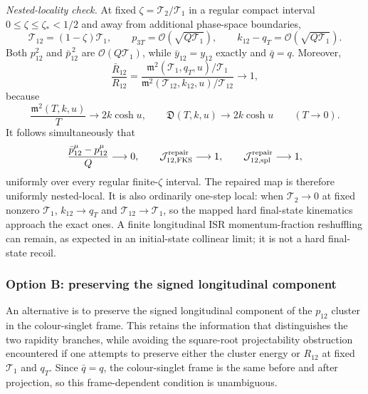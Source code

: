 \documentclass[11pt]{article}
\begin{document}
\medskip
\noindent
\textit{Nested-locality check.}
At fixed $\zeta=\mathcal T_2/\mathcal T_1$ in a regular compact interval
$0\le\zeta\le\zeta_*<1/2$ and away from additional phase-space boundaries,
\begin{equation}
\mathcal T_{12}=(1-\zeta)\mathcal T_1,
\qquad
p_{3T}=\mathcal O\!\left(\sqrt{Q\mathcal T_1}\right),
\qquad
k_{12}-q_T
=
\mathcal O\!\left(\sqrt{Q\mathcal T_1}\right).
\label{eq:isrfsr-repair-nested-scaling}
\end{equation}
Both $p_{12}^2$ and $\bar p_{12}^{\,2}$ are $\mathcal O(Q\mathcal T_1)$, while
$\bar y_{12}=y_{12}$ exactly and $\bar q=q$.  Moreover,
\begin{equation}
\frac{\bar R_{12}}{R_{12}}
=
\frac{
\mathfrak m^2(\mathcal T_1,q_T,u)/\mathcal T_1
}{
\mathfrak m^2(\mathcal T_{12},k_{12},u)/\mathcal T_{12}
}
\longrightarrow1,
\label{eq:isrfsr-repair-R12-limit}
\end{equation}
because
\begin{equation}
\frac{\mathfrak m^2(T,k,u)}{T}
\longrightarrow2k\cosh u,
\qquad
\mathfrak D(T,k,u)
\longrightarrow2k\cosh u
\qquad(T\to0).
\label{eq:isrfsr-repair-small-T-limits}
\end{equation}
It follows simultaneously that
\begin{equation}
\frac{\bar p_{12}^\mu-p_{12}^\mu}{Q}
\longrightarrow0,
\qquad
\mathcal J_{12,\rm FKS}^{\rm repair}\longrightarrow1,
\qquad
\mathcal J_{12,\rm spl}^{\rm repair}\longrightarrow1,
\label{eq:isrfsr-repair-locality-result}
\end{equation}
uniformly over every regular finite-$\zeta$ interval.  The repaired map is therefore uniformly nested-local.
It is also ordinarily one-step local: when $\mathcal T_2\to0$ at fixed nonzero $\mathcal T_1$,
$k_{12}\to q_T$ and $\mathcal T_{12}\to\mathcal T_1$, so the mapped hard final-state kinematics approach
the exact ones.  A finite longitudinal ISR momentum-fraction reshuffling can remain, as expected in an
initial-state collinear limit; it is not a hard final-state recoil.

\subsubsection{Option B: preserving the signed longitudinal component}
\label{subsubsec:z1j-isrfsr-longitudinal-repair}

An alternative is to preserve the signed longitudinal component of the $p_{12}$ cluster in the
colour-singlet frame.  This retains the information that distinguishes the two rapidity branches, while
avoiding the square-root projectability obstruction encountered if one attempts to preserve either the
cluster energy or $R_{12}$ at fixed $\mathcal T_1$ and $q_T$.  Since $\bar q=q$, the colour-singlet frame is
the same before and after projection, so this frame-dependent condition is unambiguous.
\end{document}
